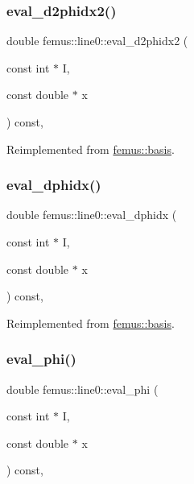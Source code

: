 \subsubsection{\texorpdfstring{eval\+\_\+d2phidx2()}{eval\_d2phidx2()}}
{\footnotesize\ttfamily double femus\+::line0\+::eval\+\_\+d2phidx2 (\begin{DoxyParamCaption}\item[{const int $\ast$}]{I,  }\item[{const double $\ast$}]{x }\end{DoxyParamCaption}) const\hspace{0.3cm}{\ttfamily [inline]}, {\ttfamily [virtual]}}



Reimplemented from \mbox{\hyperlink{classfemus_1_1basis_a0a9839e75d1c9c8302486fc072eed028}{femus\+::basis}}.

\mbox{\label{classfemus_1_1line0_a9c111514d616c479847a26b0b341ca18}} 
\subsubsection{\texorpdfstring{eval\+\_\+dphidx()}{eval\_dphidx()}}
{\footnotesize\ttfamily double femus\+::line0\+::eval\+\_\+dphidx (\begin{DoxyParamCaption}\item[{const int $\ast$}]{I,  }\item[{const double $\ast$}]{x }\end{DoxyParamCaption}) const\hspace{0.3cm}{\ttfamily [inline]}, {\ttfamily [virtual]}}



Reimplemented from \mbox{\hyperlink{classfemus_1_1basis_a4db7d29cf8a753ddbccc4a297dafa0bf}{femus\+::basis}}.

\mbox{\label{classfemus_1_1line0_a6e491417e4678a7d982bd8a4e2b1d4ea}} 
\subsubsection{\texorpdfstring{eval\+\_\+phi()}{eval\_phi()}}
{\footnotesize\ttfamily double femus\+::line0\+::eval\+\_\+phi (\begin{DoxyParamCaption}\item[{const int $\ast$}]{I,  }\item[{const double $\ast$}]{x }\end{DoxyParamCaption}) const\hspace{0.3cm}{\ttfamily [inline]}, {\ttfamily [virtual]}}



